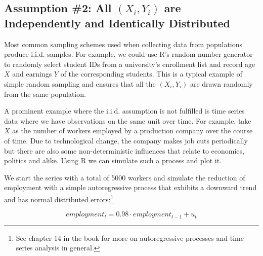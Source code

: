 \documentclass[]{book}
\let\rmarkdownfootnote\footnote%
\def\footnote{\protect\rmarkdownfootnote}
\theoremstyle{definition}
\theoremstyle{definition}
\theoremstyle{definition}
\theoremstyle{remark}
\begin{document}
\subsection*{\texorpdfstring{Assumption \#2: All \((X_i, Y_i)\) are
Independently and Identically
Distributed}{Assumption \#2: All (X\_i, Y\_i) are Independently and Identically Distributed}}\label{assumption-2-all-x_i-y_i-are-independently-and-identically-distributed}

Most common sampling schemes used when collecting data from populations
produce i.i.d. samples. For example, we could use R's random number
generator to randomly select student IDs from a university's enrollment
list and record age \(X\) and earnings \(Y\) of the corresponding
students. This is a typical example of simple random sampling and
ensures that all the \((X_i,Y_i)\) are drawn randomly from the same
population.

A prominent example where the i.i.d. assumption is not fulfilled is time
series data where we have observations on the same unit over time. For
example, take \(X\) as the number of workers employed by a production
company over the course of time. Due to technological change, the
company makes job cuts periodically but there are also some
non-deterministic influences that relate to economics, politics and
alike. Using R we can simulate such a process and plot it.

We start the series with a total of 5000 workers and simulate the
reduction of employment with a simple autoregressive process that
exhibits a downward trend and has normal distributed errors:\footnote{See
  chapter 14 in the book for more on autoregressive processes and time
  series analysis in general.}

\[ employment_t = 0.98 \cdot employment_{t-1} + u_t \]
\end{document}

